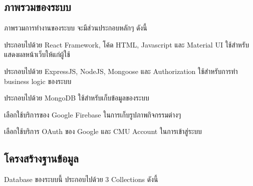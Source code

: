 \subsection{ภาพรวมของระบบ}
ภาพรวมการทำงานของระบบ จะมีส่วนประกอบหลักๆ ดังนี้

ประกอบไปด้วย React Framework, โค้ด HTML, Javascript และ Material UI ใช้สำหรับแสดงผลหน้าเว็บให้แก่ผู้ใช้

ประกอบไปด้วย ExpressJS, NodeJS, Mongoose และ Authorization ใช้สำหรับการทำ business logic ของระบบ

ประกอบไปด้วย MongoDB ใช้สำหรับเก็บข้อมูลของระบบ

เลือกใช้บริการของ Google Firebase ในการเก็บรูปภาพกิจกรรมต่างๆ

เลือกใช้บริการ OAuth ของ Google และ CMU Account ในการเข้าสู่ระบบ
\clearpage

\subsection{โครงสร้างฐานข้อมูล}
Database ของระบบนี้ ประกอบไปด้วย 3 Collections ดังนี้

